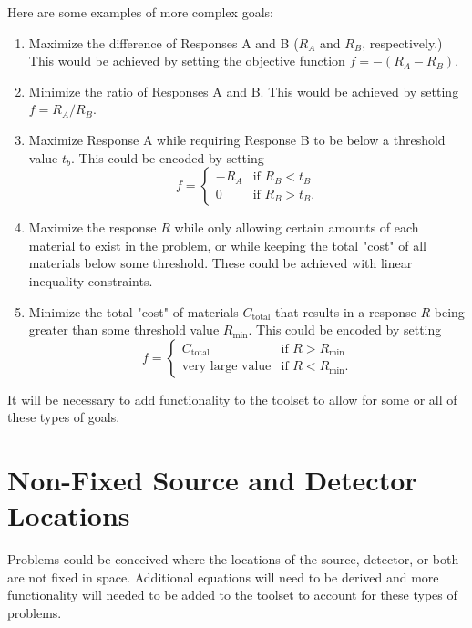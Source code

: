 Here are some examples of more complex goals:
\begin{enumerate}
  \item Maximize the difference of Responses A and B ($R_A$ and $R_B$, respectively.)
        This would be achieved by setting the objective function $f = -\left(R_A - R_B\right)$.
  \item Minimize the ratio of Responses A and B.
        This would be achieved by setting $f = R_A/R_B$.
  \item Maximize Response A while requiring Response B to be below a threshold value $t_b$.
        This could be encoded by setting \[f = \begin{cases} -R_A & \text{if } R_B < t_B \\ 0 & \text{if } R_B > t_B. \end{cases}\]
  \item Maximize the response $R$ while only allowing certain amounts of each material to exist in the problem, or while keeping the total "cost" of all materials below some threshold.
        These could be achieved with linear inequality constraints.
  \item Minimize the total "cost" of materials $C_\text{total}$ that results in a response $R$ being greater than some threshold value $R_\text{min}$.
        This could be encoded by setting \[f = \begin{cases} C_\text{total} & \text{if } R > R_\text{min} \\ \text{very large value} & \text{if } R < R_\text{min}. \end{cases}\]
\end{enumerate}

It will be necessary to add functionality to the toolset to allow for some or all of these types of goals.

\section{Non-Fixed Source and Detector Locations}
\label{sec:proposal:moving_source_and_detector}

Problems could be conceived where the locations of the source, detector, or both are not fixed in space.
Additional equations will need to be derived and more functionality will needed to be added to the toolset to account for these types of problems.

